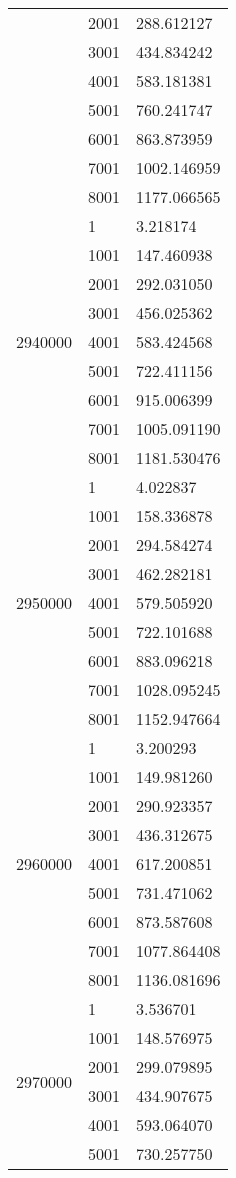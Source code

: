 \begin{table}[htb!]
\begin{tabular}{lll}
 & 2001 & 288.612127 \\
 & 3001 & 434.834242 \\
 & 4001 & 583.181381 \\
 & 5001 & 760.241747 \\
 & 6001 & 863.873959 \\
 & 7001 & 1002.146959 \\
 & 8001 & 1177.066565 \\
\multirow[c]{9}{*}{2940000} & 1 & 3.218174 \\
 & 1001 & 147.460938 \\
 & 2001 & 292.031050 \\
 & 3001 & 456.025362 \\
 & 4001 & 583.424568 \\
 & 5001 & 722.411156 \\
 & 6001 & 915.006399 \\
 & 7001 & 1005.091190 \\
 & 8001 & 1181.530476 \\
\multirow[c]{9}{*}{2950000} & 1 & 4.022837 \\
 & 1001 & 158.336878 \\
 & 2001 & 294.584274 \\
 & 3001 & 462.282181 \\
 & 4001 & 579.505920 \\
 & 5001 & 722.101688 \\
 & 6001 & 883.096218 \\
 & 7001 & 1028.095245 \\
 & 8001 & 1152.947664 \\
\multirow[c]{9}{*}{2960000} & 1 & 3.200293 \\
 & 1001 & 149.981260 \\
 & 2001 & 290.923357 \\
 & 3001 & 436.312675 \\
 & 4001 & 617.200851 \\
 & 5001 & 731.471062 \\
 & 6001 & 873.587608 \\
 & 7001 & 1077.864408 \\
 & 8001 & 1136.081696 \\
\multirow[c]{9}{*}{2970000} & 1 & 3.536701 \\
 & 1001 & 148.576975 \\
 & 2001 & 299.079895 \\
 & 3001 & 434.907675 \\
 & 4001 & 593.064070 \\
 & 5001 & 730.257750 \\

\end{tabular}
\end{table}
